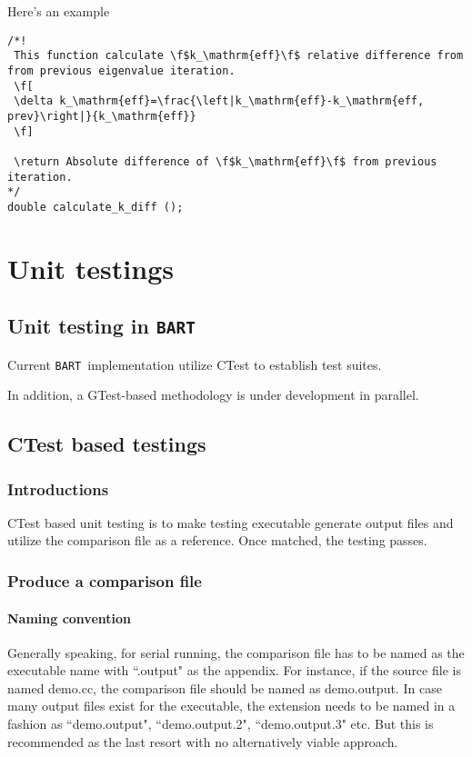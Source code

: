 \documentclass[openany]{book}
\newcommand{\bart}{{\tt BART}}
\begin{document}
Here's an example
\begin{lstlisting}
/*!
 This function calculate \f$k_\mathrm{eff}\f$ relative difference from from previous eigenvalue iteration.
 \f[
 \delta k_\mathrm{eff}=\frac{\left|k_\mathrm{eff}-k_\mathrm{eff, prev}\right|}{k_\mathrm{eff}}
 \f]
 
 \return Absolute difference of \f$k_\mathrm{eff}\f$ from previous iteration.
*/
double calculate_k_diff ();
\end{lstlisting}
\chapter{Unit testings}\label{ch: unit-tests}
\section{Unit testing in \bart}
Current \bart\ implementation utilize CTest to establish test suites. 

In addition, a GTest-based methodology is under development in parallel.
\section{CTest based testings}
\subsection{Introductions}
CTest based unit testing is to make testing executable generate output
 files and utilize the comparison file as a reference. Once matched, the
  testing passes.
\subsection{Produce a comparison file}
\subsubsection{Naming convention}
Generally speaking, for serial running, the comparison file has to be
 named as the executable name with ``.output" as the appendix. For instance, if the source file is named demo.cc, the comparison file should be named as demo.output. In case many output files
 exist for the executable, the extension needs to be named in a fashion
 as ``demo.output",
``demo.output.2", 
``demo.output.3" etc. But this is recommended as the
 last resort with no alternatively viable approach.
 
\end{document}
